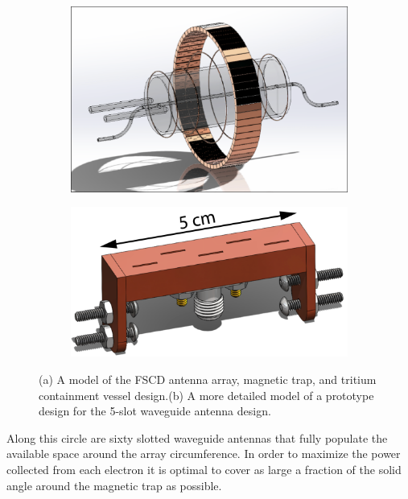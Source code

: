 \begin{figure}[htbp]
    \centering
    \begin{subfigure}{0.5\textwidth}
        \includegraphics*[width=\textwidth]{figs/Chapter-3/230614_fscd_render.png}
        \caption{}
    \end{subfigure}
    \hfill
    \begin{subfigure}{0.4\textwidth}
        \includegraphics*[width=\textwidth]{figs/Chapter-3/230614_5slot_model.png}
        \caption{}
    \end{subfigure}
    \caption{\label{fig:chap3-fscd-render} (a) A model of the FSCD antenna array, magnetic trap, and tritium containment vessel design.(b) A more detailed model of a prototype design for the 5-slot waveguide antenna design.}
\end{figure}
Along this circle are sixty slotted waveguide antennas that fully populate the available space around the array circumference. In order to maximize the power collected from each electron it is optimal to cover as large a fraction of the solid angle around the magnetic trap as possible. 

